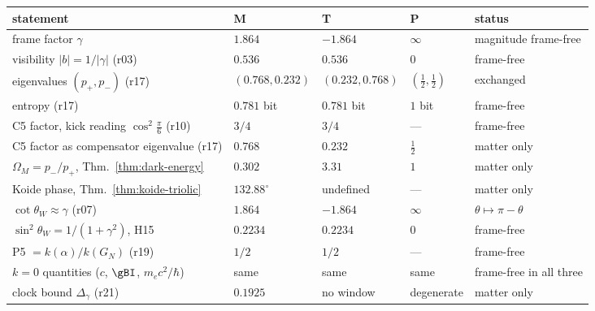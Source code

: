 \begin{center}
\footnotesize
\begin{tabular}{@{}>{\raggedright\arraybackslash}p{}>{\raggedright\arraybackslash}p{}>{\raggedright\arraybackslash}p{}>{\raggedright\arraybackslash}p{}>{\raggedright\arraybackslash}p{}@{}}
\toprule
statement & M & T & P & status\\
\midrule
frame factor \(\gamma\) & \(1.864\) & \(-1.864\) & \(\infty\) & magnitude frame-free\\
visibility \(|b|=1/|\gamma|\) (r03) & \(0.536\) & \(0.536\) & \(0\) & frame-free\\
eigenvalues \((p_+,p_-)\) (r17) & \((0.768,0.232)\) & \((0.232,0.768)\) & \((\tfrac12,\tfrac12)\) & exchanged\\
entropy (r17) & \(0.781\) bit & \(0.781\) bit & \(1\) bit & frame-free\\
C5 factor, kick reading \(\cos^2\frac\pi6\) (r10) & \(3/4\) & \(3/4\) & --- & frame-free\\
C5 factor as compensator eigenvalue (r17) & \(0.768\) & \(0.232\) & \(\tfrac12\) & matter only\\
\(\Omega_M=p_-/p_+\), Thm.~\ref{thm:dark-energy} & \(0.302\) & \(3.31\) & \(1\) & matter only\\
Koide phase, Thm.~\ref{thm:koide-triolic} & \(132.88^\circ\) & undefined & --- & matter only\\
\(\cot\theta_W\approx\gamma\) (r07) & \(1.864\) & \(-1.864\) & \(\infty\) & \(\theta\mapsto\pi-\theta\)\\
\(\sin^2\theta_W=1/(1+\gamma^2)\), H15 & \(0.2234\) & \(0.2234\) & \(0\) & frame-free\\
P5 \(=k(\alpha)/k(G_N)\) (r19) & \(1/2\) & \(1/2\) & --- & frame-free\\
\(k=0\) quantities (\(c\), \(\gBI\), \(m_ec^2/\hbar\)) & same & same & same & frame-free in all three\\
clock bound \(\Delta_\gamma\) (r21) & \(0.1925\) & no window & degenerate & matter only\\
\bottomrule
\end{tabular}
\end{center}

